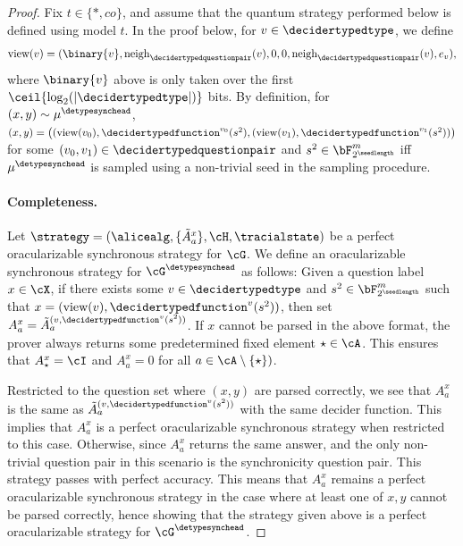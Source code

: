 \begin{proof}
	Fix $t \in \{*, co\}$, and assume that the quantum strategy performed below is defined using model $t$. In the proof below, for $v  \in \decidertypedtype$, we define
	\begin{equation} \label{eq:proofdetypeeq1}
		\text{view}(v) = (\binary{v}, \text{neigh}_{\decidertypedquestionpair}(v), 0,0,\text{neigh}_{\decidertypedquestionpair}(v),e_v),
	\end{equation}
	where $\binary{v}$ above is only taken over the first $\ceil{\log_2(|\decidertypedtype|)}$ bits. By definition, for $(x,y) \sim \mu^{\detypesynchead}$, $(x,y) = \left((\text{view}(v_0), \decidertypedfunction^{v_0}(s^2), (\text{view}(v_1),\decidertypedfunction^{v_1}(s^2))\right)$ for some $(v_0, v_1) \in \decidertypedquestionpair$ and $s^2 \in \bF_{2^{ \seedlength}}^m$ iff $\mu^{\detypesynchead}$ is sampled using a non-trivial seed in the sampling procedure. 
	
	\paragraph{Completeness. }Let $\strategy = (\alicealg, \{\tilde{A}^x_a\}, \cH ,\tracialstate)$ be a perfect oracularizable synchronous strategy for $\cG$. We define an oracularizable synchronous strategy for $\cG^{\detypesynchead}$ as follows: Given a question label $x \in \cX$, if there exists some $v \in \decidertypedtype$ and $s^2 \in \bF_{2^{ \seedlength}}^m$ such that $x= (\text{view}(v), \decidertypedfunction^{v}(s^2)) $, then set $A^x_a = \tilde{A}^{(v, \decidertypedfunction^v(s^2))}_a$. If $x$ cannot be parsed in the above format, the prover always returns some predetermined fixed element $\star \in \cA$. This ensures that $A^x_\star = \cI$ and $A^x_a = 0$ for all $a \in \cA \setminus \{\star\})$. 
	
	Restricted to the question set where $(x,y)$ are parsed correctly, we see that $A^x_a$ is the same as $\tilde{A}^{(v, \decidertypedfunction^v(s^2))}_a$ with the same decider function. This implies that $A^x_a$ is a perfect oracularizable synchronous strategy when restricted to this case. Otherwise, since $A^x_a$ returns the same answer, and the only non-trivial question pair in this scenario is the synchronicity question pair. This strategy passes with perfect accuracy. This means that $A^x_a$ remains a perfect oracularizable synchronous strategy in the case where at least one of $x,y$ cannot be parsed correctly, hence showing that the strategy given above is a perfect oracularizable strategy for $\cG^{\detypesynchead}$. 
	

\end{proof}

